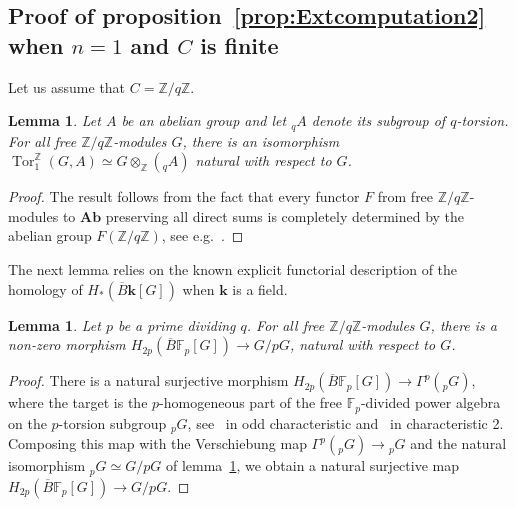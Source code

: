 \documentclass{amsart}
\newtheorem{lemma}[formula]{Lemma}
\theoremstyle{definition}
\theoremstyle{remark}
\newcommand{\Z}{\mathbb Z}
\newcommand{\F}{\mathbb F}
\DeclareMathOperator{\Tor}{Tor}
\newcommand{\Ab}{\mathbf{Ab}}
\def\k{\mathbf{k}}
\begin{document}
\subsection{Proof of proposition~\ref{prop:Extcomputation2} when $n=1$ and $C$ is finite}\label{subsec:proof1ZkZ}
Let us assume that $C=\Z/q\Z$. 
\begin{lemma}\label{lm:tenstor}
	Let $A$ be an abelian group and let $_qA$ denote its subgroup of $q$-torsion.
	For all free $\Z/q\Z$-modules $G$, there is an isomorphism $\Tor^{\Z}_1(G,A)\simeq G\otimes_\Z({}_qA)$ natural with respect to $G$.
\end{lemma}
\begin{proof}
	The result follows from the fact that every functor $F$ from free $\Z/q\Z$-modules to $\Ab$ preserving all direct sums is completely determined by the abelian group $F(\Z/q\Z)$, see e.g.~\cite{ei-60}.    
\end{proof}
The next lemma  relies on the known explicit functorial description of the homology of $H_*(\overline{B}\k[G])$ when $\k$ is a field.
\begin{lemma}\label{lm:pfn1Fp}
	Let $p$ be a prime dividing $q$. For all free $\Z/q\Z$-modules $G$, there is a non-zero morphism $H_{2p}(\overline{B}\F_p[G])\to G/pG$, natural with respect to $G$.
\end{lemma}
\begin{proof}
	There is a natural surjective morphism $H_{2p}(\overline{B}\F_p[G])\to \Gamma^p({}_pG)$, where the target is the $p$-homogeneous part of the free $\F_p$-divided power algebra on the $p$-torsion subgroup $_pG$, see~\cite[V~Theorem~(6.6)]{br-94} in odd characteristic and~\cite[Corollary~4.2]{iv-za-19} in characteristic 2. Composing this map with the Verschiebung map $\Gamma^p({}_p G)\to {}_pG$ and the natural isomorphism $_pG\simeq G/pG$ of lemma~\ref{lm:tenstor}, we obtain a natural surjective map $H_{2p}(\overline{B}\F_p[G])\to  G/pG$.    
\end{proof}
\end{document}
